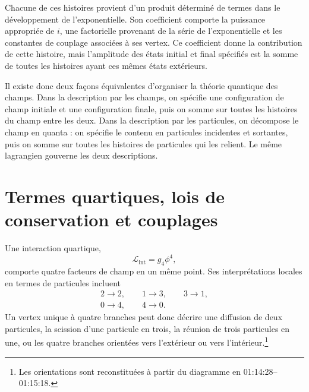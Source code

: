 Chacune de ces histoires provient d’un produit déterminé de termes dans le développement de l’exponentielle. Son coefficient comporte la puissance appropriée de \(i\), une factorielle provenant de la série de l’exponentielle et les constantes de couplage associées à ses vertex. Ce coefficient donne la contribution de cette histoire, mais l’amplitude des états initial et final spécifiés est la somme de toutes les histoires ayant ces mêmes états extérieurs.

\begin{classroomqa}
\end{classroomqa}

Il existe donc deux façons équivalentes d’organiser la théorie quantique des champs. Dans la description par les champs, on spécifie une configuration de champ initiale et une configuration finale, puis on somme sur toutes les histoires du champ entre les deux. Dans la description par les particules, on décompose le champ en quanta : on spécifie le contenu en particules incidentes et sortantes, puis on somme sur toutes les histoires de particules qui les relient. Le même lagrangien gouverne les deux descriptions.

\section{Termes quartiques, lois de conservation et couplages}

Une interaction quartique,
\begin{equation}
\mathcal{L}_{\mathrm{int}}=g_4\phi^4,
\end{equation}
comporte quatre facteurs de champ en un même point. Ses interprétations locales en termes de particules incluent
\begin{equation}
\begin{gathered}
2\longrightarrow2,
\qquad
1\longrightarrow3,
\qquad
3\longrightarrow1,\\
0\longrightarrow4,
\qquad
4\longrightarrow0.
\end{gathered}
\end{equation}
Un vertex unique à quatre branches peut donc décrire une diffusion de deux particules, la scission d’une particule en trois, la réunion de trois particules en une, ou les quatre branches orientées vers l’extérieur ou vers l’intérieur.\footnote{Les orientations sont reconstituées à partir du diagramme en 01:14:28--01:15:18.}

